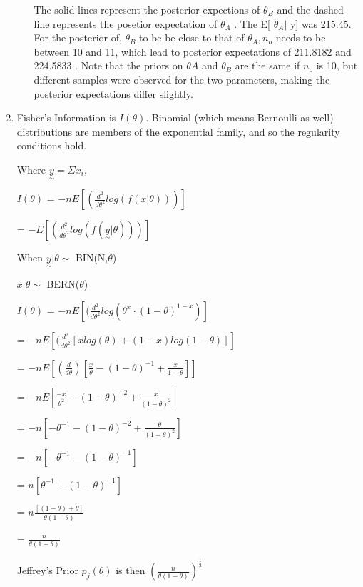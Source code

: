 \documentclass{article}\usepackage[]{graphicx}\usepackage[]{color}
\newenvironment{knitrout}{}{} %
\begin{document}
\begin{enumerate}
\begin{enumerate}
\begin{knitrout}
\end{knitrout}

The solid lines represent the posterior expections of $\theta_{B}$ and the dashed line represents the posetior expectation of $\theta_{A}$ . The E[ $\theta_{A} \vert$ y] was 215.45. For the posterior of, $\theta_{B}$ to be be close to that of $\theta_{A}, n_{o}$ needs to be between 10 and 11, which lead to posterior expectations of  211.8182 and 224.5833 . Note that the priors on $\theta{A}$ and $\theta_{B}$ are the same if $n_{o}$ is 10, but different samples were observed for the two parameters, making the posterior expectations differ slightly.
\end{enumerate}


\item%

Fisher's Information is $I(\theta)$. Binomial (which means Bernoulli as well) distributions are members of the exponential family, and so the regularity conditions hold. 

Where $\underset{\sim}{y} = \Sigma x_{i}$,

$I(\theta)$ = $-nE[(\frac{d^{2}}{d\theta^{2}}log(f(x\vert \theta)))]$

= $-E[(\frac{d^{2}}{d\theta^{2}}log(f(\underset{\sim}{y}\vert \theta)))]$

When $\underset{\sim}{y}\vert \theta \sim$ BIN(N,$\theta$)

$x\vert \theta \sim$ BERN($\theta$)

$I(\theta)$ = $-nE[(\frac{d^{2}}{d\theta^{2}}log(\theta^{x} \cdot (1 - \theta)^{1-x})]$

= $-nE[(\frac{d^{2}}{d\theta^{2}}[xlog(\theta) + (1-x)log(1 - \theta)]]$

= $-nE[(\frac{d}{d\theta})[\frac{x}{\theta} - (1 - \theta)^{-1} + \frac{x}{1 - \theta}]]$

= $-nE[\frac{-x}{\theta^{2}} - (1 - \theta)^{-2} + \frac{x}{(1 - \theta)^{2}}]$

= $-n[-\theta^{-1} - (1 - \theta)^{-2} + \frac{\theta}{(1 - \theta)^{2}}]$

= $-n[-\theta^{-1} - (1 - \theta)^{-1}]$

= $n[\theta^{-1} + (1 - \theta)^{-1}]$

= $n\frac{[(1 - \theta) + \theta]}{\theta(1-\theta)}$

= $\frac{n}{\theta(1-\theta)}$

Jeffrey's Prior $p_{j}(\theta)$ is then $(\frac{n}{\theta(1-\theta)})^{\frac{1}{2}}$

\end{enumerate}
\end{document}
